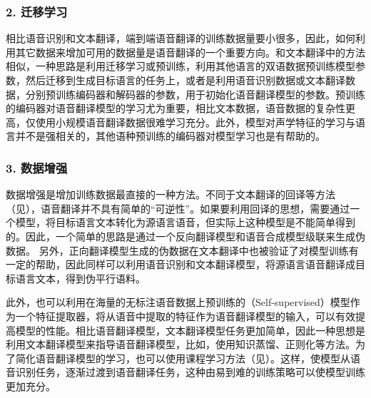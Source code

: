 \subsubsection{2. 迁移学习}

\parinterval 相比语音识别和文本翻译，端到端语音翻译的训练数据量要小很多，因此，如何利用其它数据来增加可用的数据量是语音翻译的一个重要方向。和文本翻译中的方法相似，一种思路是利用迁移学习或预训练，利用其他语言的双语数据预训练模型参数，然后迁移到生成目标语言的任务上，或者是利用语音识别数据或文本翻译数据，分别预训练编码器和解码器的参数，用于初始化语音翻译模型的参数。预训练的编码器对语音翻译模型的学习尤为重要，相比文本数据，语音数据的复杂性更高，仅使用小规模语音翻译数据很难学习充分。此外，模型对声学特征的学习与语言并不是强相关的，其他语种预训练的编码器对模型学习也是有帮助的。

\subsubsection{3. 数据增强}

\parinterval 数据增强是增加训练数据最直接的一种方法。不同于文本翻译的回译等方法（见{\chaptersixteen}），语音翻译并不具有简单的“可逆性”。如果要利用回译的思想，需要通过一个模型，将目标语言文本转化为源语言语音，但实际上这种模型是不能简单得到的。因此，一个简单的思路是通过一个反向翻译模型和语音合成模型级联来生成伪数据。 另外，正向翻译模型生成的伪数据在文本翻译中也被验证了对模型训练有一定的帮助，因此同样可以利用语音识别和文本翻译模型，将源语言语音翻译成目标语言文本，得到伪平行语料。


\parinterval 此外，也可以利用在海量的无标注语音数据上预训练的{\small{}}（Self-supervised）模型作为一个特征提取器，将从语音中提取的特征作为语音翻译模型的输入，可以有效提高模型的性能。相比语音翻译模型，文本翻译模型任务更加简单，因此一种思想是利用文本翻译模型来指导语音翻译模型，比如，使用知识蒸馏、正则化等方法。为了简化语音翻译模型的学习，也可以使用课程学习方法（见{\chapterthirteen}）。这样，使模型从语音识别任务，逐渐过渡到语音翻译任务，这种由易到难的训练策略可以使模型训练更加充分。

